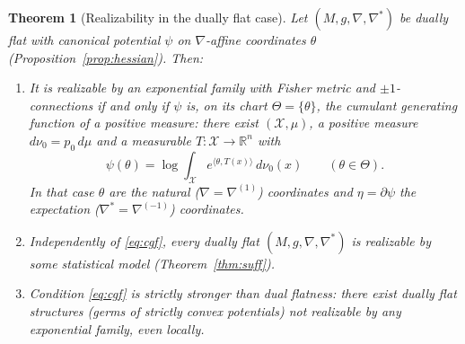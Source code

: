 \documentclass{amsart}
\newtheorem{theorem}{Theorem}
\theoremstyle{definition}
\theoremstyle{remark}
\begin{document}
\begin{theorem}[Realizability in the dually flat case]\label{thm:b}
Let $(M,g,\nabla,\nabla^{*})$ be dually flat with canonical potential $\psi$ on
$\nabla$-affine coordinates $\theta$ (Proposition~\ref{prop:hessian}). Then:
\begin{enumerate}
\item\label{it:exp} It is realizable by an exponential family with Fisher metric
and $\pm1$-connections \emph{if and only if} $\psi$ is, on its chart
$\Theta=\{\theta\}$, the cumulant generating function of a positive measure: there
exist $(\mathcal X,\mu)$, a positive measure $d\nu_{0}=p_{0}\,d\mu$ and a
measurable $T\colon\mathcal X\to\mathbb R^{n}$ with
\begin{equation}\label{eq:cgf}
  \psi(\theta)=\log\int_{\mathcal X}e^{\langle\theta,T(x)\rangle}\,d\nu_{0}(x)
  \qquad(\theta\in\Theta).
\end{equation}
In that case $\theta$ are the natural ($\nabla=\nabla^{(1)}$) coordinates and
$\eta=\partial\psi$ the expectation ($\nabla^{*}=\nabla^{(-1)}$) coordinates.
\item\label{it:always} Independently of \eqref{eq:cgf}, every dually flat
$(M,g,\nabla,\nabla^{*})$ is realizable by \emph{some} statistical model
(Theorem~\ref{thm:suff}).
\item\label{it:obstruction} Condition \eqref{eq:cgf} is strictly stronger than
dual flatness: there exist dually flat structures (germs of strictly convex
potentials) not realizable by any exponential family, even locally.
\end{enumerate}
\end{theorem}
\end{document}
